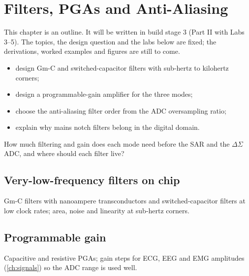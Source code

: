 \chapter{Filters, PGAs and Anti-Aliasing}\label{ch:filters}

\begin{specnote}
This chapter is an outline. It will be written in build stage 3 (Part II with Labs 3--5). The topics, the design question and the labs below are fixed; the derivations, worked examples and figures are still to come.
\end{specnote}

\begin{objectives}
\begin{itemize}
  \item design Gm-C and switched-capacitor filters with sub-hertz to kilohertz corners;
  \item design a programmable-gain amplifier for the three \OB{} modes;
  \item choose the anti-aliasing filter order from the ADC oversampling ratio;
  \item explain why mains notch filters belong in the digital domain.
\end{itemize}
\end{objectives}

\begin{insight}
How much filtering and gain does each mode need before the SAR and the $\Delta\Sigma$ ADC, and where should each filter live?
\end{insight}

\section{Very-low-frequency filters on chip}\label{sec:ch11-1}
Gm-C filters with nanoampere transconductors and switched-capacitor filters at low clock rates; area, noise and linearity at sub-hertz corners.

\section{Programmable gain}\label{sec:ch11-2}
Capacitive and resistive PGAs; gain steps for ECG, EEG and EMG amplitudes (\cref{ch:signals}) so the ADC range is used well.

